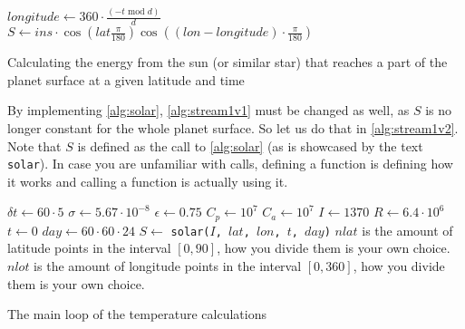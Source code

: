 \begin{algorithm}[hbt]
    \SetAlgoLined
    $longitude \leftarrow 360 \cdot \frac{(-t \text{ mod } d)}{d}$ \;
    $S \leftarrow ins \cdot \cos(lat \frac{\pi}{180}) \cos((lon - longitude) \cdot \frac{\pi}{180})$ \;
    \caption{Calculating the energy from the sun (or similar star) that reaches a part of the planet surface at a given latitude and time}
    \label{alg:solar}
\end{algorithm}

By implementing \autoref{alg:solar}, \autoref{alg:stream1v1} must be changed as well, as $S$ is no longer constant for the whole planet surface. So let us do that in \autoref{alg:stream1v2}. Note 
that $S$ is defined as the call to \autoref{alg:solar} (as is showcased by the text \texttt{solar}). In case you are unfamiliar with calls, defining a function is defining how it works and 
calling a function is actually using it.

\begin{algorithm}[hbt]
    \SetAlgoLined
    $\delta t \leftarrow 60 \cdot 5$ \;
    $\sigma \leftarrow 5.67 \cdot 10^{-8}$ \;
    $\epsilon \leftarrow 0.75$ \;
    $C_p \leftarrow 10^7$ \;
    $C_a \leftarrow 10^7$ \;
    $I \leftarrow 1370$ \;
    $R \leftarrow 6.4 \cdot 10^6$ \;
    $t \leftarrow 0$ \;
    $day \leftarrow 60 \cdot 60 \cdot 24$ \;
    $S \leftarrow$ \texttt{solar($I$, $lat$, $lon$, $t$, $day$)} \;
    $nlat$ is the amount of latitude points in the interval $[0, 90]$, how you divide them is your own choice. \;
    $nlot$ is the amount of longitude points in the interval $[0, 360]$, how you divide them is your own choice. \;

    \caption{The main loop of the temperature calculations}
    \label{alg:stream1v2}
\end{algorithm}

